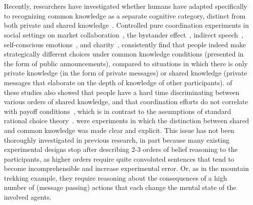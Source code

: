 \section{}\label{sect:related}\label{S:conclusion}
Recently, researchers have investigated whether humans have adapted specifically to recognizing common knowledge as a separate cognitive category, distinct from both private and shared knowledge~\cite{de2019common}. Controlled pure coordination experiments in social settings on market collaboration~\cite{thomas2014psychology}, the bystander effect~\cite{thomas2016recursive}, indirect speech~\cite{lee2010rationales}, self-conscious emotions~\cite{thomas2018common}, and charity~\cite{de2019maimonides}, consistently find that people indeed make strategically different choices under common knowledge conditions (presented in the form of public announcements), compared to situations in which there is only private knowledge (in the form of private messages) or shared knowledge (private messages that elaborate on the depth of knowledge of other participants).  of these studies also showed that people have a hard time discriminating between various orders of shared knowledge, and that coordination efforts do not correlate with payoff conditions~\cite{thomas2014psychology}, which is in contrast to the assumptions of standard rational choice theory~\cite{becker1976economic}.  were experiments in which the distinction between shared and common knowledge was made clear and explicit.  This issue has not been thoroughly investigated in previous research, in part because many existing experimental designs stop after describing 2-3 orders of belief reasoning to the participants, as higher orders require quite convoluted sentences that tend to become incomprehensible and increase experimental error. Or, as in the mountain trekking example, they require reasoning about the consequences of a high number of (message passing) actions that each change the mental state of the involved agents.

